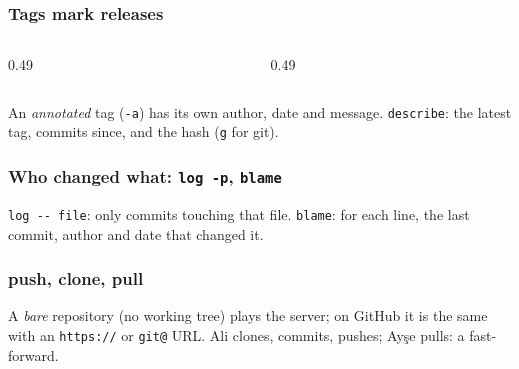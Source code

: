 \documentclass[aspectratio=169,10pt,compress]{beamer}
\begin{document}




\begin{frame}[t,fragile] \frametitle{Tags mark releases}
  \begin{columns}[T]
    \begin{column}{0.49\textwidth}
    \end{column}
    \begin{column}{0.49\textwidth}
    \end{column}
  \end{columns}

  \vspace{0.1em}
  \small
  An \emph{annotated} tag (\texttt{-a}) has its own author, date and message. \texttt{describe}: the latest tag, commits since, and the hash (\texttt{g} for git).
\end{frame}




\begin{frame}[t,fragile] \frametitle{Who changed what: \texttt{log -p}, \texttt{blame}}

  \vspace{0.1em}
  \small
  \texttt{log -{}- file}: only commits touching that file. \texttt{blame}: for each line, the last commit, author and date that changed it.
\end{frame}





\begin{frame}[t,fragile] \frametitle{push, clone, pull}

  \vspace{0.1em}
  \small
  A \emph{bare} repository (no working tree) plays the server; on GitHub it is the same with an \texttt{https://} or \texttt{git@} URL.
  Ali clones, commits, pushes; Ayşe pulls: a fast-forward.
\end{frame}
\end{document}
